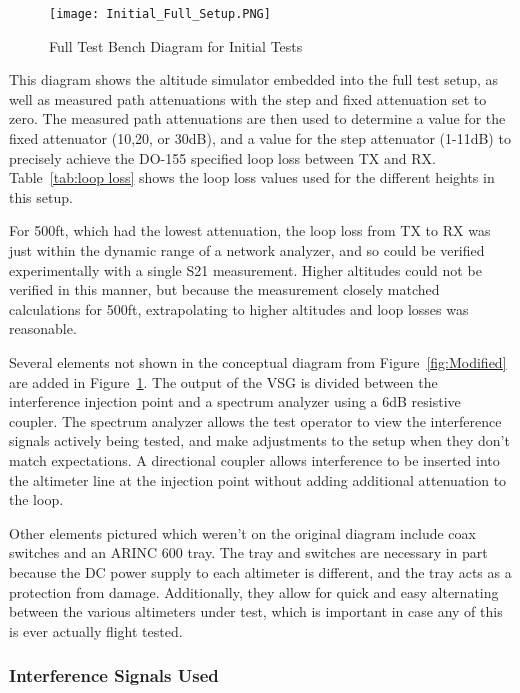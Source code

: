 \begin{figure}[ht]
\centering
\texttt{[image: Initial\_Full\_Setup.PNG]}
\caption[]{Full Test Bench Diagram for Initial Tests}

\label{fig:Initial}

\end{figure}


This diagram shows the altitude simulator  embedded into the full test setup, as well as measured path attenuations with the step and fixed attenuation set to zero. The measured path attenuations are then used to determine a value for the fixed attenuator (10,20, or 30dB), and a value for the step attenuator (1-11dB) to precisely achieve the DO-155 specified loop loss between TX and RX. Table~\ref{tab:loop loss} shows the loop loss values used for the different heights in this setup. 

For 500ft, which had the lowest attenuation, the loop loss from TX to RX was just within the dynamic range of a network analyzer, and so could be verified experimentally with a single S21 measurement. Higher altitudes could not be verified in this manner, but because the measurement closely matched calculations for 500ft, extrapolating to higher altitudes and loop losses was reasonable. 

Several elements not shown in the conceptual diagram from Figure~\ref{fig:Modified} are added in Figure~\ref{fig:Initial}. The output of the VSG is divided between the interference injection point and a spectrum analyzer using a 6dB resistive coupler. The spectrum analyzer allows the test operator to view the interference signals actively being tested, and make adjustments to the setup when they don't match expectations. A directional coupler allows interference to be inserted into the altimeter line at the injection point without adding additional attenuation to the loop. 

 Other elements pictured which weren't on the original diagram include coax switches and an ARINC 600 tray. The tray and switches are necessary in part because the DC power supply to each altimeter is different, and the tray acts as a protection from damage. Additionally, they allow for quick and easy alternating between the various altimeters under test, which is important in case any of this is ever actually flight tested. 

\subsubsection{Interference Signals Used}

